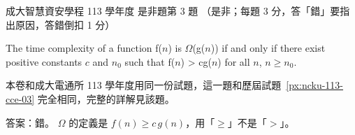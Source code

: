 \begin{pastexam}[label={px:ncku-113-isec-03}]{成大智慧資安學程 113 學年度 是非題第 3 題}
（是非；每題 3 分，答「錯」要指出原因，答錯倒扣 1 分）

The time complexity of a function f($n$) is $\Omega$(g($n$)) if and only if there exist
positive constants $c$ and $n_0$ such that f($n$) > cg($n$) for all $n$, $n\ge n_0$.
\end{pastexam}

\begin{pastsoln}
本卷和成大電通所 113 學年度用同一份試題，這一題和歷屆試題~\ref{px:ncku-113-cce-03} 完全相同，完整的詳解見該題。

答案：錯。 $\Omega$ 的定義是 $f(n) \ge c\,g(n)$，用「$\ge$」不是「$>$」。
\end{pastsoln}
